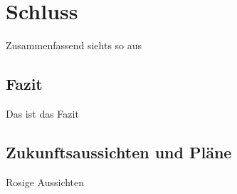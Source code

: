 \section{Schluss}
Zusammenfassend siehts so aus

\subsection{Fazit}
Das ist das Fazit

\subsection{Zukunftsaussichten und Pläne}
Rosige Aussichten